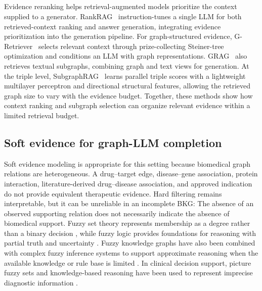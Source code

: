 \documentclass[pdflatex,sn-mathphys-num]{sn-jnl}
\begin{document}
\subsection{}
\begin{revisionblock}
Evidence reranking helps retrieval-augmented models prioritize the context supplied to a generator. RankRAG~\citep{yu2024rankrag} instruction-tunes a single LLM for both retrieved-context ranking and answer generation, integrating evidence prioritization into the generation pipeline. For graph-structured evidence, G-Retriever~\citep{he2024gretriever} selects relevant context through prize-collecting Steiner-tree optimization and conditions an LLM with graph representations. GRAG~\citep{hu2025grag} also retrieves textual subgraphs, combining graph and text views for generation. At the triple level, SubgraphRAG~\citep{li2025subgraphrag} learns parallel triple scores with a lightweight multilayer perceptron and directional structural features, allowing the retrieved graph size to vary with the evidence budget. Together, these methods show how context ranking and subgraph selection can organize relevant evidence within a limited retrieval budget.
\end{revisionblock}

\subsection{Soft evidence for graph-LLM completion}

Soft evidence modeling is appropriate for this setting because biomedical graph relations are heterogeneous. A drug--target edge, disease--gene association, protein interaction, literature-derived drug--disease association, and approved indication do not provide equivalent therapeutic evidence. Hard filtering remains interpretable, but it can be unreliable in an incomplete BKG: The absence of an observed supporting relation does not necessarily indicate the absence of biomedical support. Fuzzy set theory represents membership as a degree rather than a binary decision \citep{zadeh1965fuzzy}, while fuzzy logic provides foundations for reasoning with partial truth and uncertainty \citep{prade1980fuzzy,hajek2001metamathematics,straccia2006fuzzy,lukasiewicz2008managing}. Fuzzy knowledge graphs have also been combined with complex fuzzy inference systems to support approximate reasoning when the available knowledge or rule base is limited \citep{lan2020complexfkg}. In clinical decision support, picture fuzzy sets and knowledge-based reasoning have been used to represent imprecise diagnostic information \citep{pham2022picturefuzzyclinical,khan2026novel}.
\end{document}
